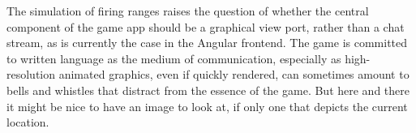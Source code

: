 The simulation of firing ranges raises the question of whether the central
component of the game app should be a graphical view port, rather than a
chat stream, as is currently the case in the Angular frontend.
The game is committed to written language as the medium of communication,
especially as high-resolution animated graphics, even if quickly
rendered, can sometimes amount to bells and whistles that distract from the
essence of the game.
But here and there it might be nice to have an image to look at, if only one
that depicts the current location.
